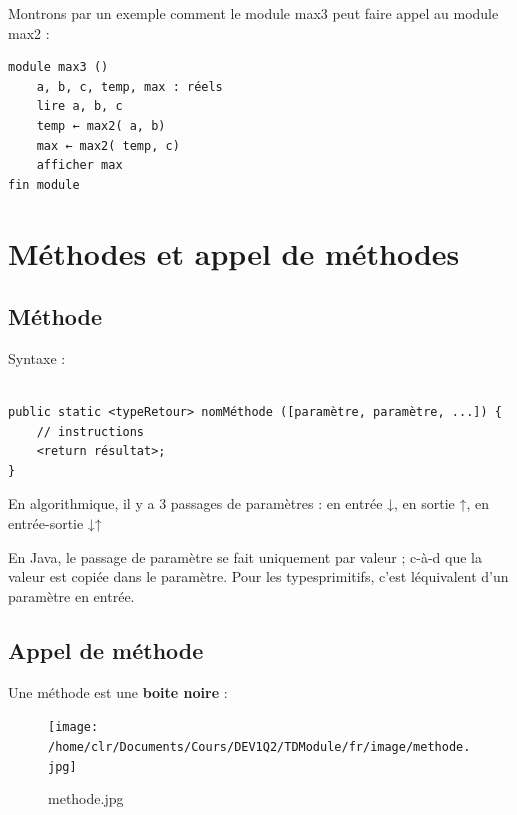\documentclass[11pt,a4paper]{article}
\begin{document}
            \par
        Montrons par un exemple comment le module max3 peut faire appel au module max2 : 
            \par
        \begin{verbatim}
module max3 ()
    a, b, c, temp, max : réels
    lire a, b, c
    temp ← max2( a, b)
    max ← max2( temp, c)
    afficher max
fin module
      \end{verbatim}\section{M\'ethodes et appel de m\'ethodes}\subsection{M\'ethode}
		  Syntaxe : 
		  \begin{verbatim}

public static <typeRetour> nomMéthode ([paramètre, paramètre, ...]) {
    // instructions
    <return résultat>;
}				\end{verbatim}
        En algorithmique, il y a 3 passages de param\`etres :
        en entr\'ee ↓, en sortie ↑, en entr\'ee-sortie ↓↑
      
            \par
        
        En Java, le passage de param\`etre se fait uniquement par valeur ; 
        c-\`a-d que la valeur est copi\'ee dans le param\`etre.
        Pour les typesprimitifs, c'est l\'equivalent d'un param\`etre en entr\'ee.
      
            \par
        \subsection{Appel de m\'ethode}
		    Une m\'ethode est une \textbf{boite noire} : 
		  
            \par
        \begin{figure}[hbt]
				    \begin{center}
					\texttt{[image: /home/clr/Documents/Cours/DEV1Q2/TDModule/fr/image/methode.jpg]}
						\end{center}
                
                    \caption[methode.jpg]{methode.jpg}
                \end{figure}
                    
\end{document}

